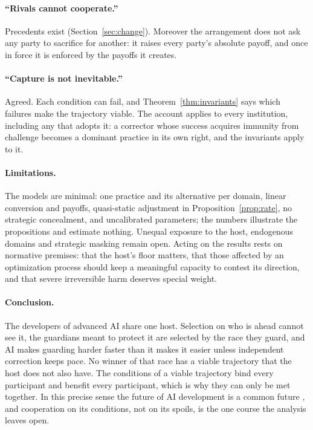 \documentclass[letterpaper]{article} %
\theoremstyle{definition}
\begin{document}
\paragraph{``Rivals cannot cooperate.''} Precedents exist (Section~\ref{sec:change}). Moreover the arrangement does not ask any party to sacrifice for another: it raises every party's absolute payoff, and once in force it is enforced by the payoffs it creates.

\paragraph{``Capture is not inevitable.''} Agreed. Each condition can fail, and Theorem~\ref{thm:invariants} says which failures make the trajectory viable. The account applies to every institution, including any that adopts it: a corrector whose success acquires immunity from challenge becomes a dominant practice in its own right, and the invariants apply to it.

\paragraph{Limitations.} The models are minimal: one practice and its alternative per domain, linear conversion and payoffs, quasi-static adjustment in Proposition~\ref{prop:rate}, no strategic concealment, and uncalibrated parameters; the numbers illustrate the propositions and estimate nothing. Unequal exposure to the host, endogenous domains and strategic masking remain open. Acting on the results rests on normative premises: that the host's floor matters, that those affected by an optimization process should keep a meaningful capacity to contest its direction, and that severe irreversible harm deserves special weight.

\paragraph{Conclusion.} The developers of advanced AI share one host. Selection on who is ahead cannot see it, the guardians meant to protect it are selected by the race they guard, and AI makes guarding harder faster than it makes it easier unless independent correction keeps pace. No winner of that race has a viable trajectory that the host does not also have. The conditions of a viable trajectory bind every participant and benefit every participant, which is why they can only be met together. In this precise sense the future of AI development is a common future \citep{wced1987}, and cooperation on its conditions, not on its spoils, is the one course the analysis leaves open.
\end{document}
